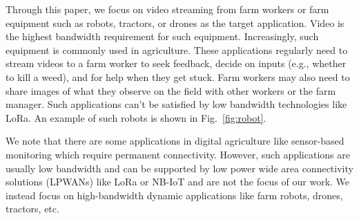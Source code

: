  Through this paper, we focus on video streaming from farm workers or farm equipment such as robots, tractors, or drones as the target application. Video is the highest bandwidth requirement for such equipment. Increasingly, such equipment is commonly used in agriculture. These applications regularly need to stream videos to a farm worker to seek feedback, decide on inputs (e.g., whether to kill a weed), and for help when they get stuck. Farm workers may also need to share images of what they observe on the field with other workers or the farm manager. Such applications can't be satisfied by low bandwidth technologies like LoRa. An example of such robots is shown in Fig.~\ref{fig:robot}. %

We note that there are some applications in digital agriculture like sensor-based monitoring which require permanent connectivity. However, such applications are usually low bandwidth and can be supported by low power wide area connectivity solutions (LPWANs) like LoRa or NB-IoT and are not the focus of our work. We instead focus on high-bandwidth dynamic applications like farm robots, drones, tractors, etc. 









